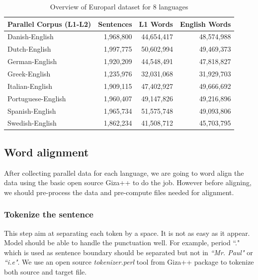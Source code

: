 \begin{table}[htbp]
  \centering

    \begin{tabular}{lrrr}

    \multicolumn{1}{c}{\textbf{Parallel Corpus (L1-L2)}} & \multicolumn{1}{c}{\textbf{Sentences}} & \multicolumn{1}{c}{\textbf{L1 Words}} & \multicolumn{1}{c}{\textbf{English Words}} \\\hline

    Danish-English & 1,968,800 & 44,654,417 & 48,574,988 \\
    Dutch-English & 1,997,775 & 50,602,994 & 49,469,373 \\
    German-English & 1,920,209 & 44,548,491 & 47,818,827 \\
    Greek-English & 1,235,976 & 32,031,068 & 31,929,703 \\
    Italian-English & 1,909,115 & 47,402,927 & 49,666,692 \\
    Portuguese-English & 1,960,407 & 49,147,826 & 49,216,896 \\
    Spanish-English & 1,965,734 & 51,575,748 & 49,093,806 \\
    Swedish-English & 1,862,234 & 41,508,712 & 45,703,795 \\

    \end{tabular}%
    \caption{Overview of Europarl dataset for 8 languages}  
    \label{tab:overviewEuroparl8Lang}%
\end{table}%

\subsection{Word alignment}
After collecting parallel data for each language, we are going to word align the data using the basic open source Giza++ to do the job. However before aligning, we should pre-process the data and pre-compute files needed for alignment. 

\subsubsection{Tokenize the sentence} This step aim at separating each token by a space. It is not as easy as it appear. Model should be able to handle the punctuation well. For example, period ``." which is used as sentence boundary should be separated but not in \textit{``Mr. Paul"} or \textit{``i.e"}. We use an open source \emph{tokenizer.perl} tool from Giza++ package to tokenize both source and target file.

